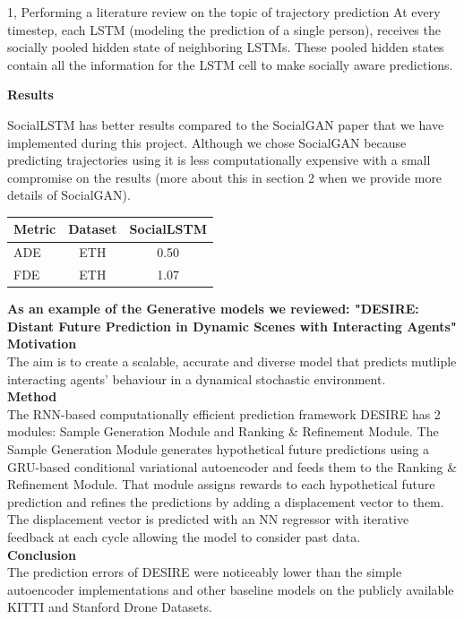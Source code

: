 \documentclass[10pt,a4paper]{article}
\begin{document}
\begin{task}{1, Performing a literature review on the topic of trajectory prediction}
    At every timestep, each LSTM (modeling the prediction of a single person), receives the socially pooled hidden state of neighboring LSTMs. These pooled hidden states contain all the information for the LSTM cell to make socially aware predictions.
    
    \textbf{Results}
    
    SocialLSTM has better results compared to the SocialGAN \cite{gupta2018social} paper that we have implemented during this project. Although we chose SocialGAN because predicting trajectories using it is less computationally expensive with a small compromise on the results (more about this in section 2 when we provide more details of SocialGAN).
    
    \begin{tabular}{|l|c|c|}
         \hline
         \textbf{Metric}&\textbf{Dataset}&SocialLSTM\\
         \hline
         ADE&ETH&0.50\\
         FDE&ETH&1.07\\
         \hline
    \end{tabular} \bigbreak
    
    \textbf{As an example of the Generative models we reviewed: "DESIRE: Distant Future Prediction in Dynamic Scenes with Interacting Agents" \cite{desire}} \\
    
    \textbf{Motivation}\\
    The aim is to create a scalable, accurate and diverse model that predicts mutliple interacting agents' behaviour in a dynamical stochastic environment.\\
    \textbf{Method}\\
    The RNN-based computationally efficient prediction framework DESIRE has 2 modules: Sample Generation Module and Ranking \& Refinement Module. The Sample Generation Module generates hypothetical future predictions using a GRU-based conditional variational autoencoder and feeds them to the Ranking \& Refinement Module. That module assigns rewards to each hypothetical future prediction and refines the predictions by adding a displacement vector to them. The displacement vector is predicted with an NN regressor with iterative feedback at each cycle allowing the model to consider past data.\\
    \textbf{Conclusion}\\
    The prediction errors of DESIRE were noticeably lower than the simple autoencoder implementations and other baseline models on the publicly available KITTI and Stanford Drone Datasets. \\
    \end{task}
\end{document}
